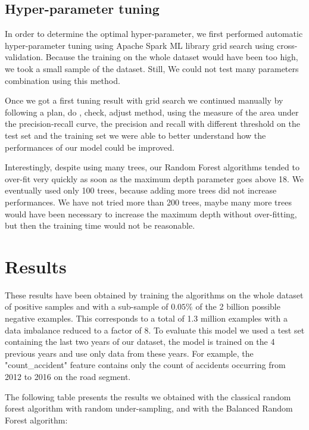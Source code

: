 \documentclass[conference]{IEEEtran}
\begin{document}
\subsection{Hyper-parameter tuning}
In order to determine the optimal hyper-parameter, we first performed automatic hyper-parameter tuning using Apache Spark ML library grid search using cross-validation.
Because the training on the whole dataset would have been too high, we took a small sample of the dataset.
Still, We could not test many parameters combination using this method.

Once we got a first tuning result with grid search we continued manually by following a plan, do , check, adjust method, using the measure of the area under the precision-recall curve, the precision and recall with different threshold on the test set and the training set we were able to better understand how the performances of our model could be improved.

Interestingly, despite using many trees, our Random Forest algorithms tended to over-fit very quickly as soon as the maximum depth parameter goes above 18.
We eventually used only 100 trees, because adding more trees did not increase performances.
We have not tried more than 200 trees, maybe many more trees would have been necessary to increase the maximum depth without over-fitting, but then the training time would not be reasonable.

\section{Results}
These results have been obtained by training the algorithms on the whole dataset of positive samples and with a sub-sample of $0.05\%$ of the 2 billion possible negative examples. This corresponds to a total of 1.3 million examples with a data imbalance reduced to a factor of 8.
To evaluate this model we used a test set containing the last two years of our dataset, the model is trained on the 4 previous years and use only data from these years.
For example, the "count\_accident" feature contains only the count of accidents occurring from 2012 to 2016 on the road segment.

The following table presents the results we obtained with the classical random forest algorithm with random under-sampling, and with the Balanced Random Forest algorithm:
\end{document}
